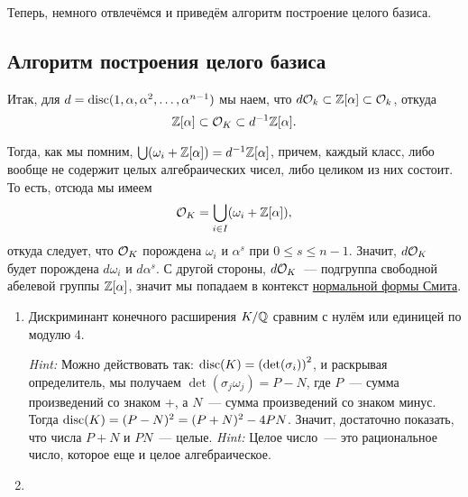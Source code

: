  	

 	Теперь, немного отвлечёмся и приведём алгоритм построение целого базиса.

 	\subsection{Алгоритм построения целого базиса}

 	Итак, для $d = \disc(1, \alpha, \alpha^2, \ldots, \alpha^{n - 1})$ мы наем, что 
 	$d \cO_{k} \subset \Z[\alpha] \subset \cO_{k}$, откуда 
 	\[
 		\Z[\alpha] \subset \cO_{K} \subset d^{-1}\Z[\alpha].
 	\]

 	Тогда, как мы помним, $\bigcup (\omega_i + \Z[\alpha]) = d^{-1}\Z[\alpha]$, причем, каждый класс, либо вообще не содержит целых алгебраических чисел, либо целиком из них состоит. То есть, отсюда мы имеем 
 	\[
 		\cO_{K} = \bigcup_{i \in I} (\omega_{i} + \Z[\alpha]),
 	\]
 	откуда следует, что $\cO_{K}$ порождена $\omega_{i}$ и $\alpha^s$ при $0 \le s \le n - 1$. Значит, $d \cO_{K}$ будет порождена  $d\omega_{i}$ и $d \alpha^s$. С другой стороны, $d\cO_{K}$~--- подгруппа свободной абелевой группы $\Z[\alpha]$, значит мы попадаем в контекст \hyperlink{smith_normal_form}{нормальной формы Смита}.

 	\begin{homework}

 	\begin{enumerate}
 		\item \begin{theorem}[Штикельберг] 
 			Дискриминант конечного расширения $K/\Q$ сравним с нулём или единицей по модулю 4. 
 		\end{theorem}
 		\emph{Hint:} Можно действовать так: $\disc(K) = \lr*{\det(\sigma_i)}^2$, и раскрывая определитель, мы получаем $\det(\sigma_{j}\omega_{j}) = P - N$, где $P$~--- сумма произведений со знаком +, а $N$~--- сумма произведений со знаком минус. Тогда $\disc(K) = (P - N)^2 = (P + N)^2 - 4 PN$. Значит, достаточно показать, что числа $P + N$ и $PN$~--- целые.  \emph{Hint:} Целое число~--- это рациональное число, которое еще и целое алгебраическое. 
 		\item
 	\end{enumerate}
 		
 	\end{homework}





	